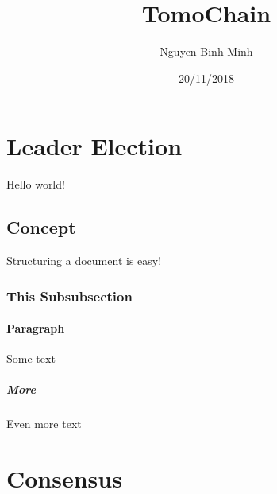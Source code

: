 \documentclass{article}
\title{TomoChain}
\date{20/11/2018}
\author{Nguyen Binh Minh}
\begin{document}
	\maketitle
	\newpage
	
	\section{Leader Election}
	Hello world!
	
		\subsection{Concept}
			Structuring a document is easy!
			\subsubsection{This Subsubsection}
		\paragraph{Paragraph}
			Some text
			\subparagraph{More}
			Even more text
	\section{Consensus}
	
\end{document}
